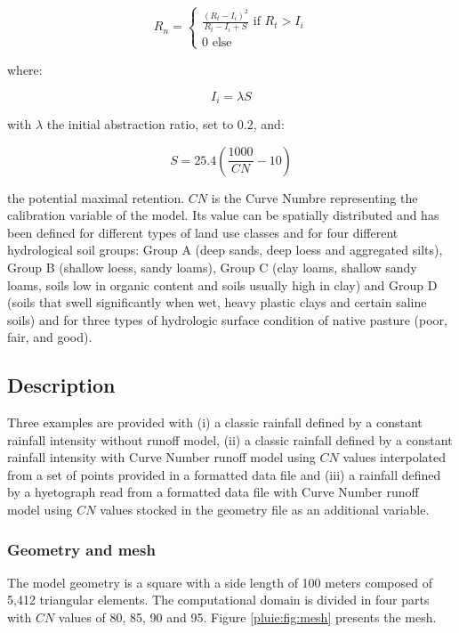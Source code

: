 \begin{equation}
  R_n=\left\{\begin{array}{l}
    \frac{(R_t-I_i)^2}{R_t-I_i+S} \text{ if } R_t>I_i\\
    0 \text{ else}
  \end{array} \right.
\end{equation}

where:

\begin{equation}
  I_i=\lambda S
\end{equation}

with $\lambda$ the initial abstraction ratio, set to 0.2, and:

\begin{equation}
  S=25.4\left(\frac{1000}{CN}-10\right)
\end{equation}

the potential maximal retention.
$CN$ is the Curve Numbre representing the calibration variable of the model.
Its value can be spatially distributed and has been defined for different types
of land use classes and for four different hydrological soil groups:
Group A (deep sands, deep loess and aggregated silts), Group B (shallow loess,
sandy loams), Group C (clay loams, shallow sandy loams, soils low in organic
content and soils usually high in clay) and Group D (soils that swell
significantly when wet, heavy plastic clays and certain saline soils) and for
three types of hydrologic surface condition of native pasture (poor, fair, and good).

\subsection{Description}

Three examples are provided with
(i) a classic rainfall defined by a constant rainfall intensity without runoff model,
(ii) a classic rainfall defined by a constant rainfall intensity with Curve
Number runoff model using $CN$ values interpolated from a set of points provided
in a formatted data file and
(iii) a rainfall defined by a hyetograph read from a formatted data file with
Curve Number runoff model using $CN$ values stocked in the geometry file as an
additional variable.

\subsubsection{Geometry and mesh}

The model geometry is a square with a side length of 100 meters composed of
5,412 triangular elements.
The computational domain is divided in four parts with $CN$ values of 80, 85,
90 and 95. Figure \ref{pluie:fig:mesh} presents the mesh.

